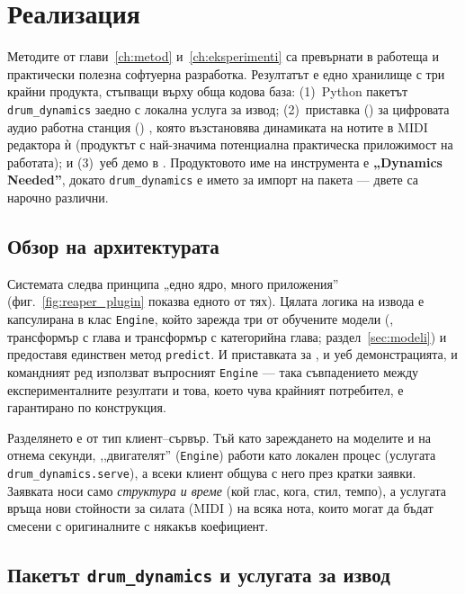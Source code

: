 \chapter{Реализация}
\label{ch:realizacia}

Методите от глави~\ref{ch:metod} и~\ref{ch:eksperimenti} са превърнати в
работеща и практически полезна софтуерна разработка. Резултатът е едно хранилище с три крайни
продукта, стъпващи върху обща кодова база: (1)~Python пакетът \texttt{drum\_dynamics}
заедно с локална услуга за извод; (2)~приставка () за
цифровата аудио работна станция () , която възстановява
динамиката на нотите в MIDI редактора ѝ (продуктът с най-значима потенциална
практическа приложимост на работата); и (3)~уеб демо в . Продуктовото
име на инструмента е \textbf{„Dynamics Needed''}, докато \texttt{drum\_dynamics} е
името за импорт на пакета — двете са нарочно различни.

\section{Обзор на архитектурата}
\label{sec:arch-overview}

Системата следва принципа „едно ядро, много приложения'' (фиг.~\ref{fig:reaper_plugin}
показва едното от тях). Цялата логика на извода е капсулирана в клас
\texttt{Engine}, който зарежда три от обучените модели (, трансформър с
 глава и трансформър с категорийна глава; раздел~\ref{sec:modeli}) и
предоставя единствен метод \texttt{predict}. И приставката за , и уеб
демонстрацията, и командният ред използват въпросният \texttt{Engine} — така
съвпадението между експерименталните резултати и това, което чува крайният
потребител, е гарантирано по конструкция.

Разделянето е от тип клиент–сървър. Тъй като зареждането на моделите и на
 отнема секунди, ,,двигателят'' (\texttt{Engine}) работи като локален процес
(услугата \texttt{drum\_dynamics.\allowbreak serve}), а всеки клиент общува с него през
кратки заявки. Заявката носи само
\emph{структура и време} (кой глас, кога, стил, темпо), а услугата връща нови
стойности за силата (MIDI ) на всяка нота, които могат да бъдат 
смесени с оригиналните с някакъв коефициент.

\section{Пакетът \texttt{drum\_dynamics} и услугата за извод}
\label{sec:package}

